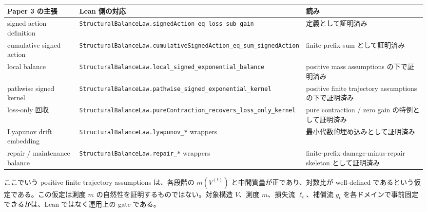 \documentclass[12pt,a4paper]{article}
\begin{document}
{\def\LTcaptype{table} %
\begin{longtable}[]{@{}
  >{\raggedright\arraybackslash}p{}
  >{\raggedright\arraybackslash}p{}
  >{\raggedright\arraybackslash}p{}@{}}
\toprule\noalign{}
\begin{minipage}[b]{\linewidth}\raggedright
Paper 3 の主張
\end{minipage} & \begin{minipage}[b]{\linewidth}\raggedright
Lean 側の対応
\end{minipage} & \begin{minipage}[b]{\linewidth}\raggedright
読み
\end{minipage} \\
\midrule\noalign{}
\endhead
\bottomrule\noalign{}
\endlastfoot
signed action definition & \texttt{StructuralBalanceLaw.signedAction\_eq\_loss\_sub\_gain} & 定義として証明済み \\
cumulative signed action & \texttt{StructuralBalanceLaw.cumulativeSignedAction\_eq\_sum\_signedAction} & finite-prefix sum として証明済み \\
local balance & \texttt{StructuralBalanceLaw.local\_signed\_exponential\_balance} & positive mass assumptions の下で証明済み \\
pathwise signed kernel & \texttt{StructuralBalanceLaw.pathwise\_signed\_exponential\_kernel} & positive finite trajectory assumptions の下で証明済み \\
loss-only 回収 & \texttt{StructuralBalanceLaw.pureContraction\_recovers\_loss\_only\_kernel} & pure contraction / zero gain の特例として証明済み \\
Lyapunov drift embedding & \texttt{StructuralBalanceLaw.lyapunov\_*} wrappers & 最小代数的埋め込みとして証明済み \\
repair / maintenance balance & \texttt{StructuralBalanceLaw.repair\_*} wrappers & finite-prefix damage-minus-repair skeleton として証明済み \\
\end{longtable}
}

ここでいう positive finite trajectory assumptions は、各段階の \(m(V^{(t)})\) と中間質量が正であり、対数比が well-defined であるという仮定である。この仮定は測度 \(m\) の自然性を証明するものではない。対象構造 \(V\)、測度 \(m\)、損失流 \(\ell_{t}\)、補償流 \(g_{t}\) を各ドメインで事前固定できるかは、Lean ではなく運用上の gate である。
\end{document}
